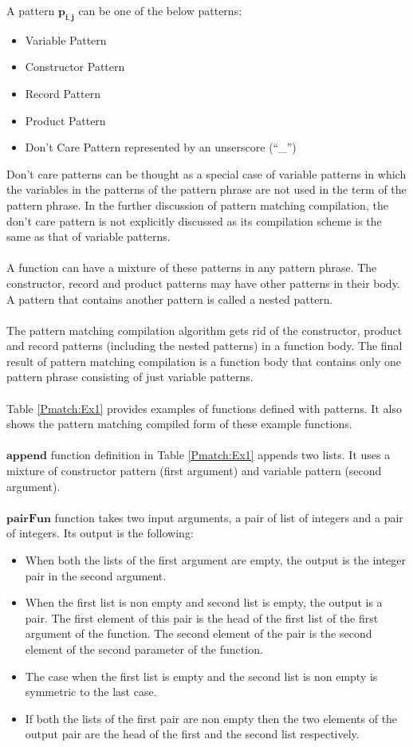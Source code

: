 \documentclass[11pt]{article}
\begin{document}
A pattern $\mathbf{p_{i,j}}$ can be one of the below patterns:
\begin{itemize}
  \item Variable Pattern
  \item Constructor Pattern
  \item Record Pattern
  \item Product Pattern
  \item Don't Care Pattern represented by an unserscore (``_'')
\end{itemize}
Don't care patterns can be thought as a special case of variable patterns in which the variables in the patterns of the pattern phrase are not used in the term of the pattern phrase. In the further discussion of pattern matching compilation, the don't care pattern is not explicitly discussed as its compilation scheme is the same as that of variable patterns. 
~~\\~~\\
A function can have a mixture of these patterns in any pattern phrase. The constructor, record and product patterns may have other patterns in their body. A pattern that contains another pattern is called a nested pattern.
~~\\~~\\
The pattern matching compilation algorithm gets rid of the constructor, product and record patterns (including the nested patterns) in a function body. The final result of pattern matching compilation is a function body that contains only one pattern phrase consisting of just variable patterns.
~~\\~~\\ 
Table \ref {Pmatch:Ex1} provides examples of functions defined with patterns. It also shows the pattern matching compiled form of these example functions. 
~~\\~~\\
$\mathbf{append}$ function definition in Table \ref {Pmatch:Ex1} appends two lists. It uses a mixture of constructor pattern (first argument) and variable pattern (second argument). 
~~\\~~\\ 
$\mathbf{pairFun}$ function takes two input arguments, a pair of list of integers and a pair of integers. Its output is the following:
\begin{itemize}
  \item When both the lists of the first argument are empty, the output is the integer pair in the second argument.
  \item When the first list is non empty and second list is empty, the output is a pair. The first element of this pair is the head of the first list of the first argument of the function. The second element of the pair is the second element of the second parameter of the function.
  \item The case when the first list is empty and the second list is non empty is symmetric to the last case.
  \item If both the lists of the first pair are non empty then the two elements of the output pair are the head of the first and the second list respectively.
\end{itemize}
\end{document}
